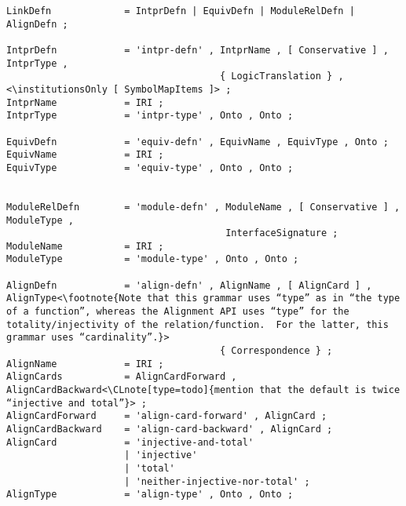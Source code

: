 \documentclass[%
\ifpretendfinal
final%
\else
draft%
\fi,
a4paper,
wd]{isov2}
\makeatletter
\newcommand*\CommentAuthor{}
\renewcommand*\CommentAuthor{#1}}
\newcommand*\CommentDate{}
\renewcommand*\CommentDate{#1}}
\newcommand*\CommentId{}
\renewcommand*\CommentId{#1}}
\newcommand*\CommentType{}
\renewcommand*\CommentType{#1}}
\newcommand*{\SetCommentColorByType}[1]{%
\edef\localType{{#1}}%
\expandafter\ifstrequal\localType{q-aut}{\colorlet{CommentColor}{red}}{%
\expandafter\ifstrequal\localType{q-all}{\colorlet{CommentColor}{orange}}{%
\expandafter\ifstrequal\localType{todo}{\colorlet{CommentColor}{orange}}{%
\expandafter\ifstrequal\localType{fyi}{\colorlet{CommentColor}{lightgray}}{%
\colorlet{CommentColor}{yellow}}}}}}
\newcommand*{\SetCommentPrefixByType}[1]{%
\edef\localType{{#1}}%
\expandafter\@ifmtarg\localType{%
\edef\CommentPrefix{}%
}{%
\caseupper[q]{#1}%
\edef\CommentPrefix{\thestring: }%
}}
\newcommand*{\initComment}[1]{%
\setkeys{Comment}{#1}%
\SetCommentColorByType{\CommentType}%
\relax%
\SetCommentPrefixByType{\CommentType}%
\relax%
}
\newcommand*{\todonote}[2][]{%
\initComment{#1}%
\pdfcomment[author=\CommentAuthor,color=CommentColor,date=\CommentDate,id=\CommentId]{%
\CommentPrefix
#2}}
\newcommand*{\todonote}[2][]{%
\initComment{#1}%
\ednote{\CommentPrefix #2}}
\newcommand*{\CLnote}[2][author=Christoph Lange]{%
\todonote[author=Christoph Lange,#1]{#2}}
\newcommand*{\institutionsOnly}{\bfseries\itshape}
\makeatother
\begin{document}
\begin{lstlisting}[language=ebnf,escapeinside={<>},mathescape]
LinkDefn             = IntprDefn | EquivDefn | ModuleRelDefn | AlignDefn ;

IntprDefn            = 'intpr-defn' , IntprName , [ Conservative ] , IntprType ,
                                      { LogicTranslation } , <\institutionsOnly [ SymbolMapItems ]> ;
IntprName            = IRI ;
IntprType            = 'intpr-type' , Onto , Onto ;

EquivDefn            = 'equiv-defn' , EquivName , EquivType , Onto ;
EquivName            = IRI ;
EquivType            = 'equiv-type' , Onto , Onto ;


ModuleRelDefn        = 'module-defn' , ModuleName , [ Conservative ] , ModuleType ,
                                       InterfaceSignature ;
ModuleName           = IRI ;
ModuleType           = 'module-type' , Onto , Onto ;

AlignDefn            = 'align-defn' , AlignName , [ AlignCard ] , AlignType<\footnote{Note that this grammar uses “type” as in “the type of a function”, whereas the Alignment API uses “type” for the totality/injectivity of the relation/function.  For the latter, this grammar uses “cardinality”.}> 
                                      { Correspondence } ;
AlignName            = IRI ;
AlignCards           = AlignCardForward , AlignCardBackward<\CLnote[type=todo]{mention that the default is twice “injective and total”}> ;
AlignCardForward     = 'align-card-forward' , AlignCard ;
AlignCardBackward    = 'align-card-backward' , AlignCard ;
AlignCard            = 'injective-and-total'
                     | 'injective'
                     | 'total'
                     | 'neither-injective-nor-total' ;
AlignType            = 'align-type' , Onto , Onto ;


\end{lstlisting}
\end{document}
